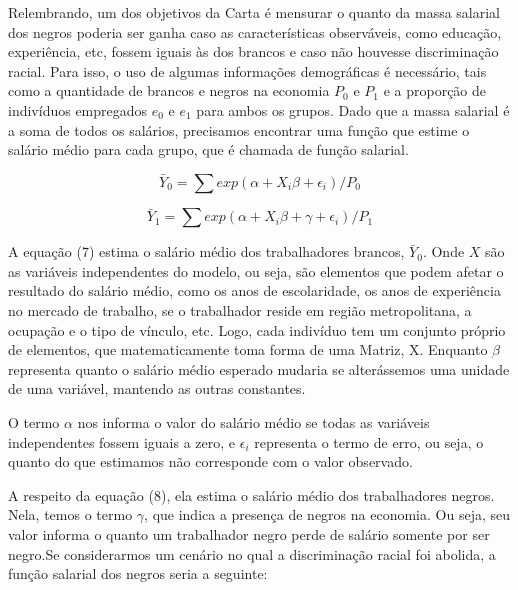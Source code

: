 \documentclass{article}
\begin{document}
	Relembrando, um dos objetivos da Carta é mensurar o quanto da massa salarial dos negros poderia ser ganha caso as características observáveis, como educação, experiência, etc, fossem iguais às dos brancos e caso não houvesse discriminação racial. Para isso, o uso de algumas informações demográficas é necessário, tais como a quantidade de brancos e negros na economia $P_{0}$ e $P_{1}$ e a proporção de indivíduos empregados $e_{0}$ e $e_{1}$ para ambos os grupos. Dado que a massa salarial é a soma de todos os salários, precisamos encontrar uma função que estime o salário médio para cada grupo, que é chamada de função salarial.
	
	\begin{equation}
		\bar{Y}_{0} = \sum exp(\alpha + X_{i}\beta + \epsilon_{i})/P_{0} 
	\end{equation}
	
	\begin{equation}
		\bar{Y}_{1} = \sum exp(\alpha + X_{i}\beta + \gamma + \epsilon_{i})/P_{1}  
	\end{equation}
	
	A equação (7) estima o salário médio dos trabalhadores brancos, $\bar{Y}_{0}$. Onde $X$ são as variáveis independentes do modelo, ou seja, são elementos que podem afetar o resultado do salário médio, como os anos de escolaridade, os anos de experiência no mercado de trabalho, se o trabalhador reside em região metropolitana, a ocupação e o tipo de vínculo, etc. Logo, cada indivíduo tem um conjunto próprio de elementos, que matematicamente toma forma de uma Matriz, X. Enquanto $\beta$ representa quanto o salário médio esperado mudaria se alterássemos uma unidade de uma variável, mantendo as outras constantes. \newline
	
	O termo $\alpha$ nos informa o valor do salário médio se todas as variáveis independentes fossem iguais a zero, e $\epsilon_{i}$ representa o termo de erro, ou seja, o quanto do que estimamos não corresponde com o valor observado. \newline
	
	A respeito da equação (8), ela estima o salário médio dos trabalhadores negros. Nela, temos o termo $\gamma$, que indica a presença de negros na economia. Ou seja,  seu valor informa o quanto um trabalhador negro perde de salário somente por ser negro.Se considerarmos um cenário no qual a discriminação racial foi abolida, a função salarial dos negros seria a seguinte: \newline
	
\end{document}
